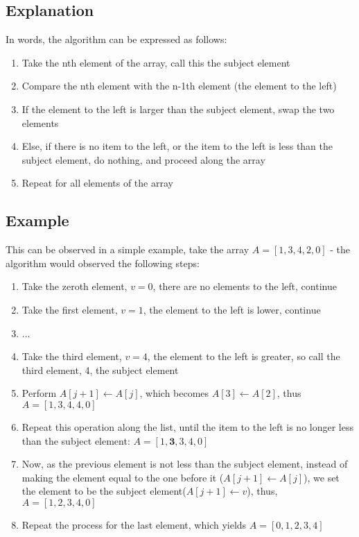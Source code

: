 \documentclass{article}
\begin{document}
\subsection{Explanation}
In words, the algorithm can be expressed as follows:
\begin{enumerate}[itemsep=0mm]
    \item Take the nth element of the array, call this the subject element
    \item Compare the nth element with the n-1th element (the element to the left)
    \item If the element to the left is larger than the subject element, swap the two elements
    \item Else, if there is no item to the left, or the item to the left is less than the subject element, do nothing, and proceed along the array
    \item Repeat for all elements of the array
\end{enumerate}

\subsection{Example}
This can be observed in a simple example, take the array $A=[1, 3, 4, 2, 0]$ - the algorithm would observed the following steps:

\begin{enumerate}[itemsep=0mm]
    \item Take the zeroth element, $v=0$, there are no elements to the left, continue
    \item Take the first element, $v=1$, the element to the left is lower, continue
    \item ...
    \item Take the third element, $v=4$, the element to the left is greater, so call the third element, 4, the subject element
    \item Perform $A[j + 1] \leftarrow A[j]$, which becomes $A[3] \leftarrow A[2]$, thus $A=[1, 3, 4, 4, 0]$
    \item Repeat this operation along the list, until the item to the left is no longer less than the subject element: $A=[1, \mathbf{3}, 3, 4, 0]$
    \item Now, as the previous element is not less than the subject element, instead of making the element equal to the one before it ($A[j + 1] \leftarrow A[j]$), we set the element to be the subject element($A[j + 1] \leftarrow      v$), thus, $A=[1, 2, 3, 4, 0]$
    \item Repeat the process for the last element, which yields $A=[0, 1, 2, 3, 4]$
\end{enumerate}
\end{document}
